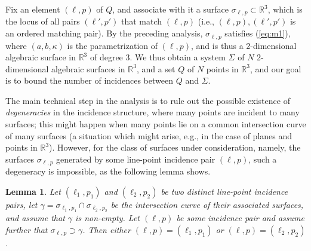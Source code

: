 \documentclass[12pt]{article}
\def\reals{{\mathbb R}}
\newtheorem{lemma}[theorem]{Lemma}
\begin{document}
Fix an element $(\ell,p)$ of $Q$, and associate with it a surface
$\sigma_{\ell,p}\subset \reals^3$, which is the locus of all
pairs $(\ell',p')$ that match $(\ell,p)$ (i.e., $(\ell,p),(\ell',p')$
is an ordered matching pair).
By the preceding analysis, $\sigma_{\ell,p}$ satisfies (\ref{eq:m1}),
where $(a,b,\kappa)$ is the parametrization of $(\ell,p)$,
and is thus a 2-dimensional algebraic surface
in $\reals^3$ of degree $3$. We thus obtain a system $\Sigma$ of 
$N$ 2-dimensional algebraic surfaces in $\reals^3$, and a set $Q$ 
of $N$ points in $\reals^3$, and our goal is to bound the number 
of incidences between $Q$ and $\Sigma$. 

The main technical step in the analysis is to rule out the possible
existence of
{\em degeneracies} in the incidence structure, where many points 
are incident to many surfaces; 
this might happen when many points lie on a common intersection
curve of many surfaces (a situation which might 
arise, e.g., in the case of planes and points in $\reals^3$). 
However, for the class of surfaces under consideration, namely, the
surfaces $\sigma_{\ell,p}$ generated by some line-point incidence pair
$(\ell,p)$, such a degeneracy is impossible, as the
following lemma shows.
\begin{lemma} \label{lem:gamma}
Let $(\ell_1,p_1)$ and $(\ell_2,p_2)$ be two distinct line-point
incidence pairs,
let $\gamma = \sigma_{\ell_1,p_1} \cap \sigma_{\ell_2,p_2}$ be the
intersection curve of their associated surfaces, and assume that
$\gamma$ is non-empty.
Let $(\ell,p)$ be some incidence pair and assume further that
$\sigma_{\ell,p} \supset \gamma$.
Then either $(\ell,p) = (\ell_1,p_1)$ or $(\ell,p) = (\ell_2,p_2)$.
\end{lemma}
\end{document}
